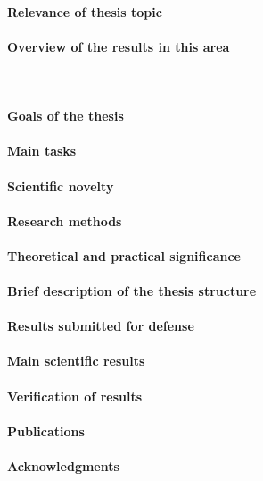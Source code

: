 \paragraph{Relevance of thesis topic}
\lipsum[1]

\paragraph{Overview of the results in this area}
\lipsum[1]~\cite{bib1}

\paragraph{Goals of the thesis}
\lipsum[1]

\paragraph{Main tasks}
\lipsum[1]


\paragraph{Scientific novelty}
\lipsum[1]

\paragraph{Research methods}
\lipsum[1]

\paragraph{Theoretical and practical significance}
\lipsum[1]

\paragraph{Brief description of the thesis structure}
\lipsum[1]

\paragraph{Results submitted for defense}
\lipsum[1]

\paragraph{Main scientific results}
\lipsum[1]

\paragraph{Verification of results}
\lipsum[1]

\paragraph{Publications}
\lipsum[1]

\paragraph{Acknowledgments}
\lipsum[1]